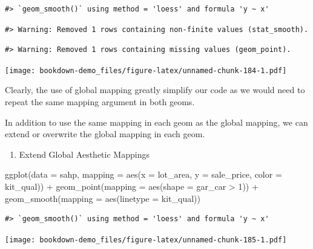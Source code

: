\documentclass[
]{book}
\newenvironment{Shaded}{\begin{snugshade}}{\end{snugshade}}
\newcommand{\AttributeTok}[1]{\textcolor[rgb]{0.77,0.63,0.00}{#1}}
\newcommand{\DecValTok}[1]{\textcolor[rgb]{0.00,0.00,0.81}{#1}}
\newcommand{\FunctionTok}[1]{\textcolor[rgb]{0.00,0.00,0.00}{#1}}
\newcommand{\NormalTok}[1]{#1}
\newcommand{\SpecialCharTok}[1]{\textcolor[rgb]{0.00,0.00,0.00}{#1}}
\providecommand{\tightlist}{%
  \setlength{\itemsep}{0pt}\setlength{\parskip}{0pt}}
\begin{document}
\begin{verbatim}
#> `geom_smooth()` using method = 'loess' and formula 'y ~ x'
\end{verbatim}

\begin{verbatim}
#> Warning: Removed 1 rows containing non-finite values (stat_smooth).
\end{verbatim}

\begin{verbatim}
#> Warning: Removed 1 rows containing missing values (geom_point).
\end{verbatim}

\texttt{[image: bookdown-demo\_files/figure-latex/unnamed-chunk-184-1.pdf]}

Clearly, the use of global mapping greatly simplify our code as we would need to repeat the same mapping argument in both geoms.

In addition to use the same mapping in each geom as the global mapping, we can extend or overwrite the global mapping in each geom.

\begin{enumerate}
\def\labelenumi{\arabic{enumi}.}
\tightlist
\item
  Extend Global Aesthetic Mappings
\end{enumerate}

\begin{Shaded}
\begin{Highlighting}[]
\FunctionTok{ggplot}\NormalTok{(}\AttributeTok{data =}\NormalTok{ sahp, }\AttributeTok{mapping =} \FunctionTok{aes}\NormalTok{(}\AttributeTok{x =}\NormalTok{ lot\_area, }\AttributeTok{y =}\NormalTok{ sale\_price, }\AttributeTok{color =}\NormalTok{ kit\_qual)) }\SpecialCharTok{+} \FunctionTok{geom\_point}\NormalTok{(}\AttributeTok{mapping =} \FunctionTok{aes}\NormalTok{(}\AttributeTok{shape =}\NormalTok{ gar\_car }\SpecialCharTok{\textgreater{}} \DecValTok{1}\NormalTok{)) }\SpecialCharTok{+} \FunctionTok{geom\_smooth}\NormalTok{(}\AttributeTok{mapping =} \FunctionTok{aes}\NormalTok{(}\AttributeTok{linetype =}\NormalTok{ kit\_qual))}
\end{Highlighting}
\end{Shaded}

\begin{verbatim}
#> `geom_smooth()` using method = 'loess' and formula 'y ~ x'
\end{verbatim}

\texttt{[image: bookdown-demo\_files/figure-latex/unnamed-chunk-185-1.pdf]}
\end{document}
